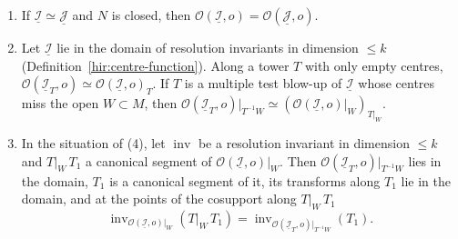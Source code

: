 \begin{lemma}
\begin{enumerate}
\item If \(\underline{\mathcal I}\simeq\underline{\mathcal J}\) and \(N\) is closed, then \(\mathcal O(\underline{\mathcal I},o)=\mathcal O(\underline{\mathcal J},o)\).
\item Let \(\underline{\mathcal I}\) lie in the domain of resolution invariants in dimension \(\le k\) (Definition~\ref{hir:centre-function}). Along a tower \(T\) with only empty
centres, \(\mathcal O(\underline{\mathcal I}_T,o)\simeq\mathcal O(\underline{\mathcal I},o)_T\). If \(T\) is a multiple test blow-up of \(\underline{\mathcal I}\) whose centres miss the open
\(W\subset M\), then \(\mathcal O(\underline{\mathcal I}_T,o)|_{T^{-1}W}\simeq(\mathcal O(\underline{\mathcal I},o)|_W)_{T|_W}\).
\item In the situation of (4), let \(\operatorname{inv}\) be a resolution invariant in dimension \(\le k\) and \(T|_W\,T_1\) a canonical segment of \(\mathcal O(\underline{\mathcal I},o)|_W\). Then
\(\mathcal O(\underline{\mathcal I}_T,o)|_{T^{-1}W}\) lies in the domain, \(T_1\) is a canonical segment of it, its transforms along \(T_1\) lie in the domain, and at the points of the
cosupport along \(T|_W\,T_1\)
\[\operatorname{inv}_{\mathcal O(\underline{\mathcal I},o)|_W}(T|_W\,T_1)=\operatorname{inv}_{\mathcal O(\underline{\mathcal I}_T,o)|_{T^{-1}W}}(T_1).\]
\end{enumerate}
\end{lemma}
